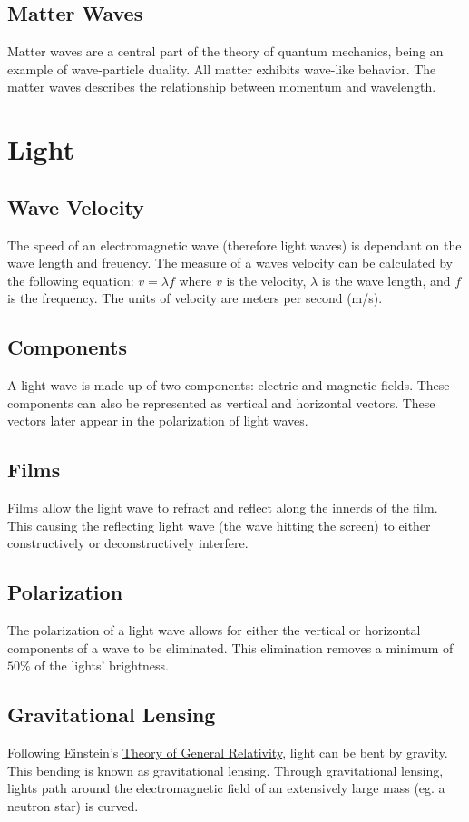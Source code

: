 \documentclass{article}
\begin{document}
\subsection{Matter Waves}
Matter waves are a central part of the theory of quantum mechanics, being an example of wave-particle duality. All matter exhibits wave-like behavior. The matter waves describes the relationship between momentum and wavelength.


\section{Light}
\subsection{Wave Velocity}
The speed of an electromagnetic wave (therefore light waves) is dependant on the wave length and freuency. The measure of a waves velocity can be calculated by the following equation: $v = \lambda f$ where $v$ is the velocity, $\lambda$ is the wave length, and $f$ is the frequency. The units of velocity are meters per second (m/s).

\subsection{Components}
A light wave is made up of two components: electric and magnetic fields. These components can also be represented as vertical and horizontal vectors. These vectors later appear in the polarization of light waves.

\subsection{Films}
Films allow the light wave to refract and reflect along the innerds of the film. This causing the reflecting light wave (the wave hitting the screen) to either constructively or deconstructively interfere.

\subsection{Polarization}
The polarization of a light wave allows for either the vertical or horizontal components of a wave to be eliminated. This elimination removes a minimum of $50\%$ of the lights' brightness.

\subsection{Gravitational Lensing}\label{sec:gravitational_lensing}
Following Einstein's \hyperref[sec:generalrelativity]{Theory of General Relativity}, light can be bent by gravity. This bending is known as gravitational lensing. Through gravitational lensing, lights path around the electromagnetic field of an extensively large mass (eg. a neutron star) is curved.
\end{document}
